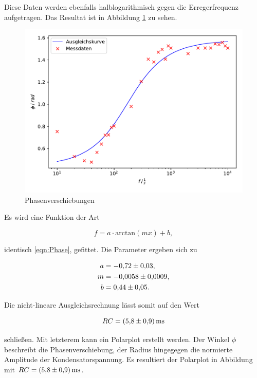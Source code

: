 Diese Daten werden ebenfalls halblogarithmisch gegen die Erregerfrequenz 
aufgetragen. Das Resultat ist in Abbildung \ref{fig:plot3} zu sehen. 

\begin{figure}
  \centering
  \includegraphics[scale=0.8]{content/plot3.pdf}
  \caption{Phasenverschiebungen}
  \label{fig:plot3}
\end{figure}

Es wird eine Funktion der Art 

\begin{equation*}
f = a\cdot\text{arctan}(mx)+b,
\end{equation*}

identisch \eqref{eqn:Phase}, gefittet. Die Parameter ergeben sich zu 

\begin{align*}
a &= \num{-0.72+-0.03},\\
m &= \num{-0.0058+-0.0009},\\
b &= \num{0.44+-0.05}.
\end{align*}

Die nicht-lineare Ausgleichsrechnung lässt somit auf den Wert

\begin{equation*}
RC = \SI{5.8+-0.9}{\milli\second}
\end{equation*}

schließen.
Mit letzterem kann ein Polarplot erstellt werden. Der Winkel $\phi$ beschreibt 
die Phasenverschiebung, der Radius hingegegen die normierte Amplitude der
Kondensatorspannung. Es resultiert der Polarplot in Abbildung mit 
$RC = \SI{5.8+-0.9}{\milli\second}$.

